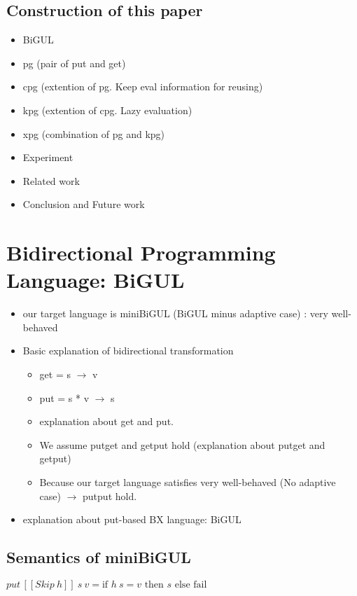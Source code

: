 \documentclass[runningheads]{llncs}
\newcommand{\sif}[3]{\text{if } #1 \text{ then } #2 \text{ else } #3}
\newcommand{\putbx}[3]{put \, [\![#1]\!] \ #2 \ #3}
\begin{document}
\subsection{Construction of this paper}

\begin{itemize}
\item BiGUL 
\item pg (pair of put and get)
\item cpg (extention of pg. Keep eval information for reusing)
\item kpg (extention of cpg. Lazy evaluation)
\item xpg (combination of pg and kpg)
\item Experiment
\item Related work
\item Conclusion and Future work
\end{itemize}

\section{Bidirectional Programming Language: BiGUL}

\begin{itemize}
\item our target language is miniBiGUL (BiGUL minus adaptive case) : very well-behaved
\item Basic explanation of bidirectional transformation
  \begin{itemize}
  \item get = s $\to$ v
  \item put = s * v $\to$ s
  \item explanation about get and put.
  \item We assume putget and getput hold (explanation about putget and getput)
  \item Because our target language satisfies very well-behaved (No adaptive case) $\to$ putput hold.
  \end{itemize}
\item explanation about put-based BX language: BiGUL
\end{itemize}

\subsection{Semantics of miniBiGUL}

$\putbx{Skip \ h}{s}{v} = \sif{h \ s = v}{s}{\text{fail}}$
\end{document}

